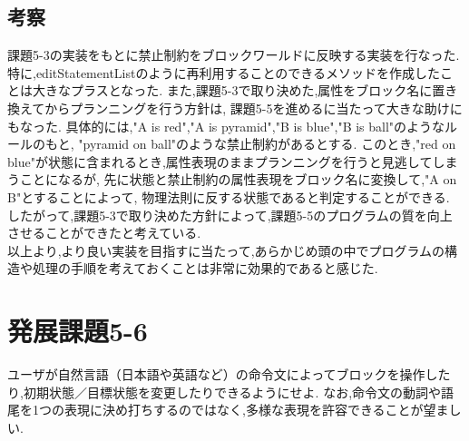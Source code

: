 \documentclass[uplatex,12pt]{jsarticle}
\begin{document}
\subsection{考察}
課題5-3の実装をもとに禁止制約をブロックワールドに反映する実装を行なった.
特に,editStatementListのように再利用することのできるメソッドを作成したことは大きなプラスとなった.
また,課題5-3で取り決めた,属性をブロック名に置き換えてからプランニングを行う方針は,
課題5-5を進めるに当たって大きな助けにもなった.
具体的には,"A is red","A is pyramid","B is blue","B is ball"のようなルールのもと,
"pyramid on ball"のような禁止制約があるとする.
このとき,"red on blue"が状態に含まれるとき,属性表現のままプランニングを行うと見逃してしまうことになるが,
先に状態と禁止制約の属性表現をブロック名に変換して,"A on B"とすることによって,
物理法則に反する状態であると判定することができる. \\
したがって,課題5-3で取り決めた方針によって,課題5-5のプログラムの質を向上させることができたと考えている. \\
以上より,より良い実装を目指すに当たって,あらかじめ頭の中でプログラムの構造や処理の手順を考えておくことは非常に効果的であると感じた.


\section{発展課題5-6}
\begin{screen}
    ユーザが自然言語（日本語や英語など）の命令文によってブロックを操作したり,初期状態／目標状態を変更したりできるようにせよ.
    なお,命令文の動詞や語尾を1つの表現に決め打ちするのではなく,多様な表現を許容できることが望ましい.
\end{screen}
\end{document}
